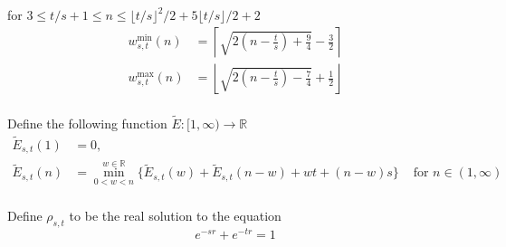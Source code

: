\documentclass[]{article}
\begin{document}
\vspace{1cm}
\begin{lemma} for $3\leq t/s +1 \leq n \leq \lfloor t/s\rfloor^2/2+5\lfloor t/s\rfloor / 2 +2$
	\begin{align*}
		w^{\min}_{s,t}(n) &= \left\lceil \sqrt{2\left(n-\frac{t}{s}\right)+\frac{9}{4}}-\frac{3}{2} \right\rceil\\
		w^{\max}_{s,t}(n) &= \left\lfloor \sqrt{2\left(n-\frac{t}{s}\right)-\frac{7}{4}}+\frac{1}{2} \right\rfloor\\
	\end{align*}
\end{lemma}

\vspace{1cm}
\begin{definition}[Continuous]
	Define the following function $\tilde{E}: [1, \infty)\to\mathbb{R}$
	\begin{align*}
		\tilde{E}_{s,t}(1) &= 0, \\
		\tilde{E}_{s,t}(n) &= \min_{0<w<n}^{w\in\mathbb{R}}\{\tilde{E}_{s,t}(w) + \tilde{E}_{s,t}(n-w) + wt+(n-w)s\}&\text{ for } n\in(1,\infty) \\
		\end{align*}
\end{definition}

\vspace{1cm}
\begin{definition}
	Define $\rho_{s,t}$ to be the real solution to the equation
	\[
	e^{-sr} + e^{-tr} = 1
	\]
\end{definition}
\end{document}
